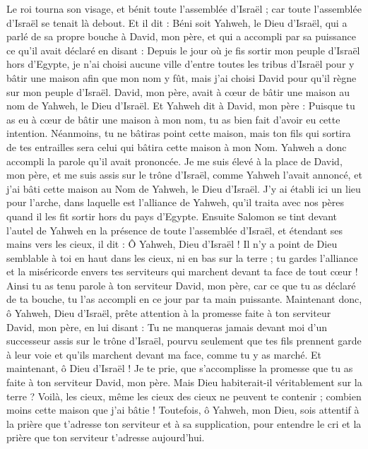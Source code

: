 \begin{multicols}{2}
Le roi tourna son visage, et bénit toute l'assemblée d'Israël ; car toute l'assemblée d'Israël se tenait là debout.
Et il dit : Béni soit Yahweh, le Dieu d'Israël, qui a parlé de sa propre bouche à David, mon père, et qui a accompli par sa puissance ce qu'il avait déclaré en disant :
Depuis le jour où je fis sortir mon peuple d'Israël hors d'Egypte, je n'ai choisi aucune ville d'entre toutes les tribus d'Israël pour y bâtir une maison afin que mon nom y fût, mais j'ai choisi David pour qu'il règne sur mon peuple d'Israël.
David, mon père, avait à cœur de bâtir une maison au nom de Yahweh, le Dieu d'Israël.
Et Yahweh dit à David, mon père : Puisque tu as eu à cœur de bâtir une maison à mon nom, tu as bien fait d'avoir eu cette intention.
Néanmoins, tu ne bâtiras point cette maison, mais ton fils qui sortira de tes entrailles sera celui qui bâtira cette maison à mon Nom.
Yahweh a donc accompli la parole qu'il avait prononcée. Je me suis élevé à la place de David, mon père, et me suis assis sur le trône d'Israël, comme Yahweh l'avait annoncé, et j'ai bâti cette maison au Nom de Yahweh, le Dieu d'Israël.
J'y ai établi ici un lieu pour l'arche, dans laquelle est l'alliance de Yahweh, qu'il traita avec nos pères quand il les fit sortir hors du pays d'Egypte.
Ensuite Salomon se tint devant l'autel de Yahweh en la présence de toute l'assemblée d'Israël, et étendant ses mains vers les cieux,
il dit : Ô Yahweh, Dieu d'Israël ! Il n'y a point de Dieu semblable à toi en haut dans les cieux, ni en bas sur la terre ; tu gardes l'alliance et la miséricorde envers tes serviteurs qui marchent devant ta face de tout cœur !
Ainsi tu as tenu parole à ton serviteur David, mon père, car ce que tu as déclaré de ta bouche, tu l'as accompli en ce jour par ta main puissante.
Maintenant donc, ô Yahweh, Dieu d'Israël, prête attention à la promesse faite à ton serviteur David, mon père, en lui disant : Tu ne manqueras jamais devant moi d'un successeur assis sur le trône d'Israël, pourvu seulement que tes fils prennent garde à leur voie et qu'ils marchent devant ma face, comme tu y as marché.
Et maintenant, ô Dieu d'Israël ! Je te prie, que s'accomplisse la promesse que tu as faite à ton serviteur David, mon père.
Mais Dieu habiterait-il véritablement sur la terre ? Voilà, les cieux, même les cieux des cieux ne peuvent te contenir ; combien moins cette maison que j'ai bâtie !
Toutefois, ô Yahweh, mon Dieu, sois attentif à la prière que t'adresse ton serviteur et à sa supplication, pour entendre le cri et la prière que ton serviteur t'adresse aujourd'hui.

\end{multicols}
